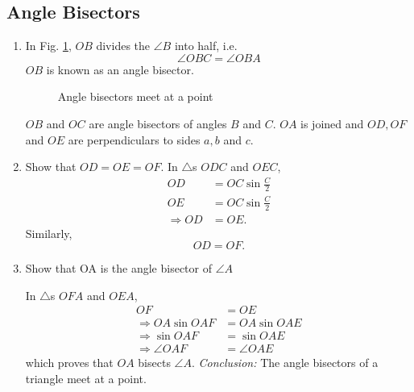 \subsection{Angle Bisectors}
\renewcommand{\theequation}{\theenumi}
\begin{enumerate}[label=\arabic*.,ref=\thesubsection.\theenumi]
\item
	In Fig. \ref{ch3_angle_bisector}, $OB$ divides the  $\angle B$ into half, i.e.\begin{equation}
	\angle OBC = \angle OBA
	\end{equation}
	$OB$ is known as an angle bisector.


\begin{figure}[!ht]
	\begin{center}
		
		\resizebox{\columnwidth}{!}{}
	\end{center}
	\caption{Angle bisectors meet at a point}
	\label{ch3_angle_bisector}	
\end{figure}

	$OB$ and $OC$ are angle bisectors of angles $B$ and $C$. $OA$ is joined and $OD, OF$ and $OE$ are perpendiculars to sides $a,b$ and $c$.
\item
  Show that $OD = OE = OF$.
\solution In $\triangle$s $ODC$ and $OEC$,
\begin{align}
OD &= OC \sin \frac{C}{2}
\\
OE &= OC \sin \frac{C}{2} 
\\
\Rightarrow OD &=OE.
\end{align}
Similarly,
\begin{equation}
OD = OF.
\end{equation}
%
\item
	Show that OA is the angle bisector of $\angle A$

\solution In $\triangle$s $OFA$ and $OEA$,
\begin{align}
OF &= OE
\\
\Rightarrow OA \sin OAF &= OA \sin OAE \\
\Rightarrow \sin OAF &=  \sin OAE \\
\Rightarrow \angle OAF &= \angle OAE
\end{align}
which proves that $OA$ bisects $\angle A$.
{\em Conclusion:} The angle bisectors of a triangle meet at a point.

\end{enumerate}
